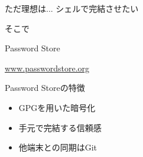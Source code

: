 \documentclass{beamer}
\begin{document}
\begin{frame}{ただ理想は...}
  シェルで完結させたい
\end{frame}

\begin{frame}{そこで}
  \begin{center}
    Password Store

    \url{www.passwordstore.org}
  \end{center}
\end{frame}

\begin{frame}{Password Storeの特徴}
  \begin{itemize}
    \item GPGを用いた暗号化
    \item 手元で完結する信頼感
    \item 他端末との同期はGit
  \end{itemize}
\end{frame}
\end{document}
